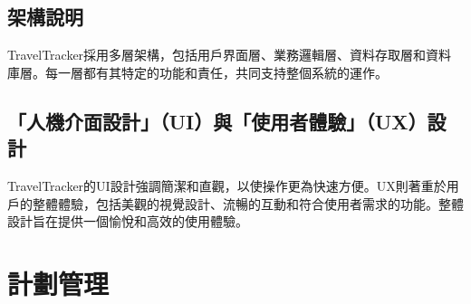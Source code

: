 \documentclass[12pt]{article}
\begin{document}
\subsection{架構說明}

TravelTracker採用多層架構，包括用戶界面層、業務邏輯層、資料存取層和資料庫層。每一層都有其特定的功能和責任，共同支持整個系統的運作。

\subsection{「人機介面設計」（UI）與「使用者體驗」（UX）設計}


TravelTracker的UI設計強調簡潔和直觀，以使操作更為快速方便。UX則著重於用戶的整體體驗，包括美觀的視覺設計、流暢的互動和符合使用者需求的功能。整體設計旨在提供一個愉悅和高效的使用體驗。

\section{計劃管理}
\end{document}
